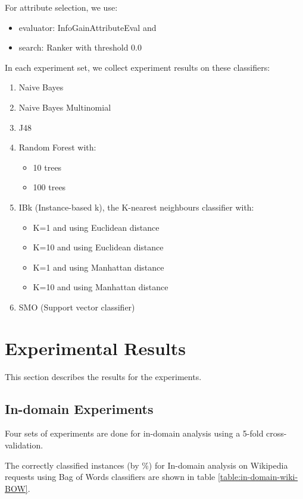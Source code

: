\documentclass[conference]{IEEEtran}
\begin{document}
For attribute selection, we use:
\begin{itemize}
\item evaluator: InfoGainAttributeEval and
\item search: Ranker with threshold 0.0
\end{itemize}

In each experiment set, we collect experiment results on these classifiers:
\begin{enumerate}
\item Naive Bayes
\item  Naive Bayes Multinomial
\item J48
\item Random Forest with:
    \begin{itemize}
    \item 10 trees
    \item 100 trees
    \end{itemize}
\item IBk (Instance-based k), the K-nearest neighbours classifier with:
    \begin{itemize}
    \item K=1 and using Euclidean distance
    \item K=10 and using Euclidean distance
    \item K=1 and using Manhattan distance
    \item K=10 and using Manhattan distance
    \end{itemize}
\item SMO (Support vector classifier)
\end{enumerate}

\section{Experimental Results}

This section describes the results for the experiments.

\subsection{In-domain Experiments}
Four sets of experiments are done for in-domain analysis using a 5-fold cross-validation. 

The correctly classified instances (by \%) for In-domain analysis on Wikipedia requests using Bag of Words classifiers are shown in table \ref{table:in-domain-wiki-BOW}.
\end{document}
